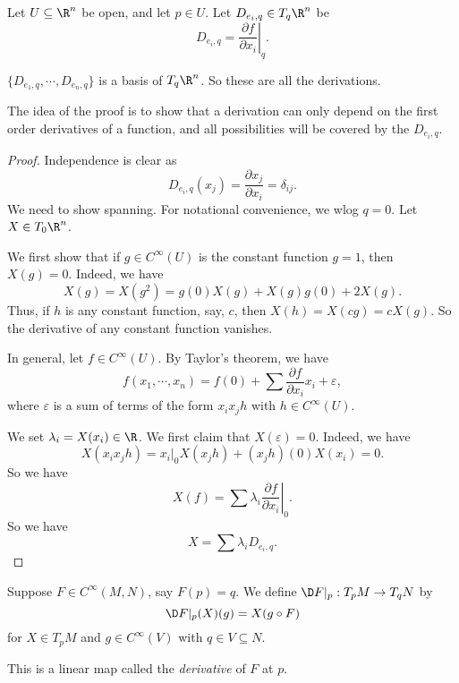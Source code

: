 \documentclass[a4paper]{article}
\begin{document}
\begin{eg}
  Let $U \subseteq \R^n$ be open, and let $p \in U$. Let $D_{e_i, q} \in T_q \R^n$ be
  \[
    D_{e_i, q} = \left.\frac{\partial f}{\partial x_i}\right|_q.
  \]
\end{eg}

\begin{lemma}
  $\{D_{e_1, q}, \cdots, D_{e_n, q}\}$ is a basis of $T_q \R^n$. So these are all the derivations.
\end{lemma}

The idea of the proof is to show that a derivation can only depend on the first order derivatives of a function, and all possibilities will be covered by the $D_{e_i, q}$.

\begin{proof}
  Independence is clear as
  \[
    D_{e_i, q}(x_j) = \frac{\partial x_j}{\partial x_i} = \delta_{ij}.
  \]
  We need to show spanning. For notational convenience, we wlog $q = 0$. Let $X \in T_0 \R^n$.

  We first show that if $g \in C^\infty(U)$ is the constant function $g = 1$, then $X(g) = 0$. Indeed, we have
  \[
    X(g) = X(g^2) = g(0) X(g) + X(g) g(0) + 2 X(g).
  \]
  Thus, if $h$ is any constant function, say, $c$, then $X(h) = X(cg) = c X(g)$. So the derivative of any constant function vanishes.

  In general, let $f \in C^\infty(U)$. By Taylor's theorem, we have
  \[
    f(x_1, \cdots, x_n) = f(0) + \sum \frac{\partial f}{\partial x_i} x_i + \varepsilon,
  \]
  where $\varepsilon$ is a sum of terms of the form $x_i x_j h$ with $h \in C^\infty(U)$.

  We set $\lambda_i = X(x_i) \in \R$. We first claim that $X(\varepsilon) = 0$. Indeed, we have
  \[
    X (x_i x_j h) = x_i|_{0} X(x_j h) + (x_jh)(0) X(x_i) = 0.
  \]
  So we have
  \[
    X(f) = \sum \lambda_i \left.\frac{\partial f}{\partial x_i}\right|_0.
  \]
  So we have
  \[
    X = \sum \lambda_i D_{e_i, q}.
  \]
\end{proof}

\begin{defi}[Derivative]
  Suppose $F \in C^\infty(M, N)$, say $F(p) = q$. We define $\D F|_p: T_p M \to T_q N$ by
  \[
    \D F|_p(X)(g) = X(g \circ F)
  \]
  for $X \in T_pM$ and $g \in C^\infty(V)$ with $q \in V \subseteq N$.

  This is a linear map called the \emph{derivative} of $F$ at $p$.
\end{defi}
\end{document}
